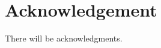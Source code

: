 %
\chapter*{Acknowledgement}
\label{sec:acknowledgement}
\vspace*{-10mm}

There will be acknowledgments.
